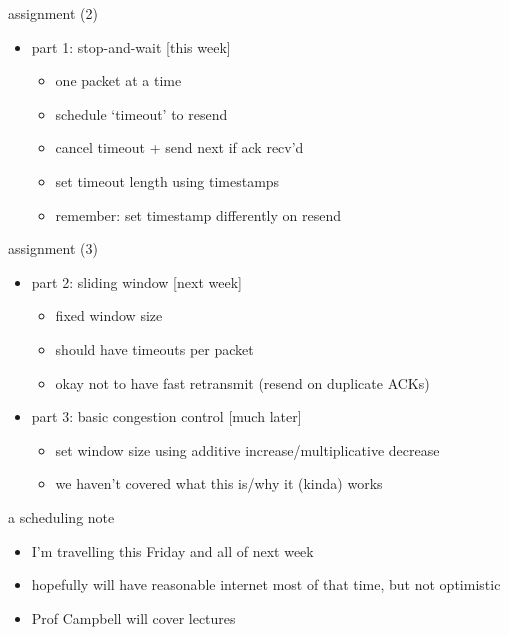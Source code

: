 \begin{frame}{assignment (2)}
    \begin{itemize}
    \item part 1: stop-and-wait [this week]
        \begin{itemize}
        \item one packet at a time
        \item schedule `timeout' to resend
        \item cancel timeout + send next if ack recv'd
        \item set timeout length using timestamps
        \item remember: set timestamp differently on resend
        \end{itemize}
    \end{itemize}
\end{frame}

\begin{frame}{assignment (3)}
    \begin{itemize}
    \item part 2: sliding window [next week]
        \begin{itemize}
        \item fixed window size
        \item should have timeouts per packet
        \item okay not to have fast retransmit (resend on duplicate ACKs)
        \end{itemize}
    \item part 3: basic congestion control [much later]
        \begin{itemize}
        \item set window size using additive increase/multiplicative decrease
        \item we haven't covered what this is/why it (kinda) works
        \end{itemize}
    \end{itemize}
\end{frame}

\begin{frame}{a scheduling note}
    \begin{itemize}
    \item I'm travelling this Friday and all of next week
    \item hopefully will have reasonable internet most of that time, but not optimistic
    \vspace{.5cm}
    \item Prof Campbell will cover lectures
    \end{itemize}
\end{frame}

